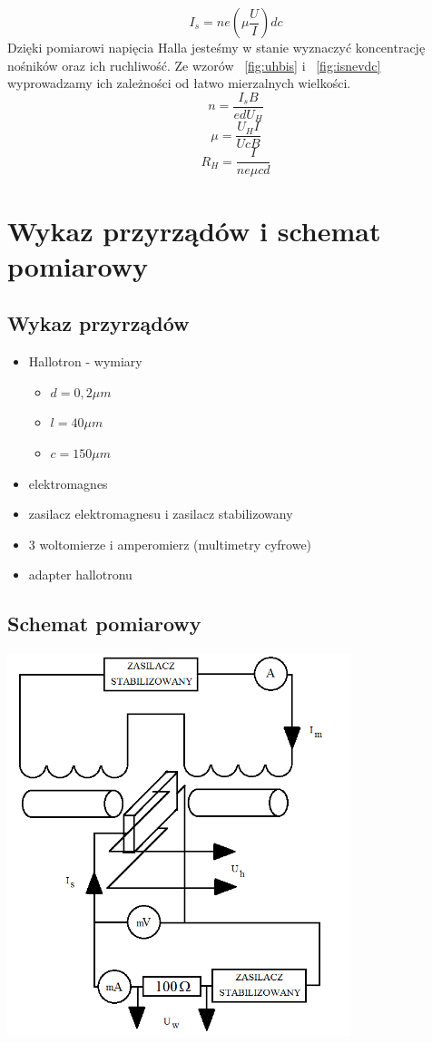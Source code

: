 \documentclass[10pt,a4paper]{article}
\begin{document}
\begin{equation}
\label{fig:isnevdc}
I_s=ne\left( \mu\frac{U}{I}\right) dc
\end{equation} 
Dzięki pomiarowi napięcia Halla jesteśmy w stanie wyznaczyć koncentrację nośników oraz ich ruchliwość. Ze wzorów ~\ref{fig:uhbis} i ~\ref{fig:isnevdc} wyprowadzamy ich zależności od łatwo mierzalnych wielkości.
\begin{equation}
\label{fig:nwzor}
n =\frac{I_sB}{edU_H}
\end{equation} 
\begin{equation}
\label{fig:muwzor}
\mu = \frac{U_H I}{UcB}
\end{equation}
\begin{equation}
\label{fig:rhwzor}
R_H = \frac{I}{ne\mu cd}
\end{equation} 
\newpage

\section{Wykaz przyrządów i schemat pomiarowy}
\subsection{Wykaz przyrządów}
\begin{itemize}
\item Hallotron - wymiary \begin{itemize}
\item $d = 0,2 \mu m$ 
\item $l = 40 \mu m$
\item $c = 150 \mu m$
\end{itemize}
\item elektromagnes
\item zasilacz elektromagnesu i zasilacz stabilizowany
\item 3 woltomierze i amperomierz (multimetry cyfrowe)
\item adapter hallotronu
\end{itemize}
\subsection{Schemat pomiarowy}
\includegraphics[width=10cm]{schemat.png}
\end{document}
